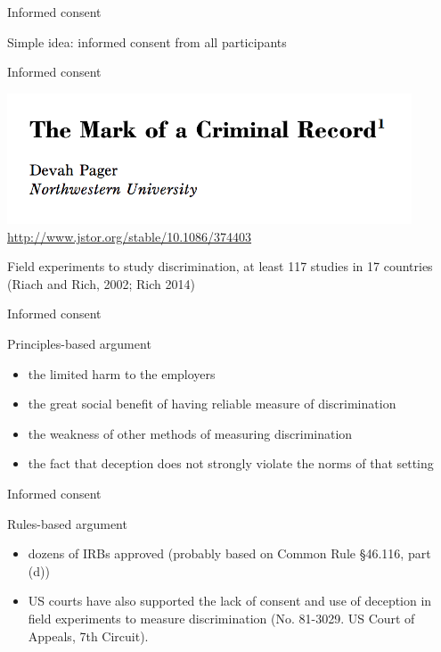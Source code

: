 \documentclass{beamer}
\def\vf{\vfill}
\begin{document}
\begin{frame}{Informed consent}

Simple idea: informed consent from all participants

\end{frame}
\begin{frame}{Informed consent}

\begin{center}
\includegraphics[width=0.9\textwidth]{figures/pager_mark_2003_title.png}\\
\tiny{\url{http://www.jstor.org/stable/10.1086/374403}}
\end{center}
\vf
Field experiments to study discrimination, at least 117 studies in 17 countries (Riach and Rich, 2002; Rich 2014)\\

\end{frame}
\begin{frame}{Informed consent}

Principles-based argument
\begin{itemize}
\item the limited harm to the employers
\item the great social benefit of having reliable measure of discrimination
\item the weakness of other methods of measuring discrimination
\item the fact that deception does not strongly violate the norms of that setting
\end{itemize}

\end{frame}
\begin{frame}{Informed consent}

Rules-based argument
\begin{itemize}
\item dozens of IRBs approved (probably based on Common Rule §46.116, part (d))
\item US courts have also supported the lack of consent and use of deception in field experiments to measure discrimination (No. 81-3029.
US Court of Appeals, 7th Circuit).
\end{itemize}

\end{frame}
\end{document}

